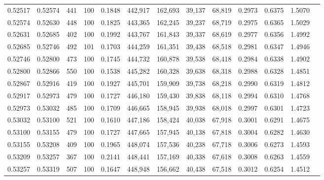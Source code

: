 \begin{tabular}{rrrrrrrrrrrrr}
0.52517 & 0.52574 &   441 & 100 &                                     0.1848 & 442,917 & 162,693 &  39,137 &  68,819 & 0.2973 & 0.6375 & 1.5070 \\
0.52574 & 0.52630 &   448 & 100 &                                     0.1825 & 443,365 & 162,245 &  39,237 &  68,719 & 0.2975 & 0.6365 & 1.5029 \\
0.52631 & 0.52685 &   402 & 100 &                                     0.1992 & 443,767 & 161,843 &  39,337 &  68,619 & 0.2977 & 0.6356 & 1.4992 \\
0.52685 & 0.52746 &   492 & 101 &                                     0.1703 & 444,259 & 161,351 &  39,438 &  68,518 & 0.2981 & 0.6347 & 1.4946 \\
0.52746 & 0.52800 &   473 & 100 &                                     0.1745 & 444,732 & 160,878 &  39,538 &  68,418 & 0.2984 & 0.6338 & 1.4902 \\
0.52800 & 0.52866 &   550 & 100 &                                     0.1538 & 445,282 & 160,328 &  39,638 &  68,318 & 0.2988 & 0.6328 & 1.4851 \\
0.52867 & 0.52916 &   419 & 100 &                                     0.1927 & 445,701 & 159,909 &  39,738 &  68,218 & 0.2990 & 0.6319 & 1.4812 \\
0.52917 & 0.52973 &   479 & 100 &                                     0.1727 & 446,180 & 159,430 &  39,838 &  68,118 & 0.2994 & 0.6310 & 1.4768 \\
0.52973 & 0.53032 &   485 & 100 &                                     0.1709 & 446,665 & 158,945 &  39,938 &  68,018 & 0.2997 & 0.6301 & 1.4723 \\
0.53032 & 0.53100 &   521 & 100 &                                     0.1610 & 447,186 & 158,424 &  40,038 &  67,918 & 0.3001 & 0.6291 & 1.4675 \\
0.53100 & 0.53155 &   479 & 100 &                                     0.1727 & 447,665 & 157,945 &  40,138 &  67,818 & 0.3004 & 0.6282 & 1.4630 \\
0.53155 & 0.53208 &   409 & 100 &                                     0.1965 & 448,074 & 157,536 &  40,238 &  67,718 & 0.3006 & 0.6273 & 1.4593 \\
0.53209 & 0.53257 &   367 & 100 &                                     0.2141 & 448,441 & 157,169 &  40,338 &  67,618 & 0.3008 & 0.6263 & 1.4559 \\
0.53257 & 0.53319 &   507 & 100 &                                     0.1647 & 448,948 & 156,662 &  40,438 &  67,518 & 0.3012 & 0.6254 & 1.4512 \\

\end{tabular}

